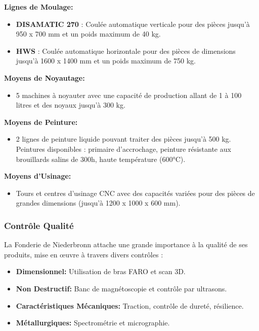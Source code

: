 \documentclass[12pt]{article}
\begin{document}
\textbf{Lignes de Moulage:}
\begin{itemize}
    \item \textbf{DISAMATIC 270} : Coulée automatique verticale pour des pièces jusqu'à 950 x 700 mm et un poids maximum de 40 kg.
    \item \textbf{HWS} : Coulée automatique horizontale pour des pièces de dimensions jusqu'à 1600 x 1400 mm et un poids maximum de 750 kg.
\end{itemize}

\textbf{Moyens de Noyautage:}
\begin{itemize}
    \item 5 machines à noyauter avec une capacité de production allant de 1 à 100 litres et des noyaux jusqu'à 300 kg.
\end{itemize}

\textbf{Moyens de Peinture:}
\begin{itemize}
    \item 2 lignes de peinture liquide pouvant traiter des pièces jusqu'à 500 kg. Peintures disponibles : primaire d'accrochage, peinture résistante aux brouillards salins de 300h, haute température (600°C).
\end{itemize}

\textbf{Moyens d'Usinage:}
\begin{itemize}
    \item Tours et centres d'usinage CNC avec des capacités variées pour des pièces de grandes dimensions (jusqu'à 1200 x 1000 x 600 mm).
\end{itemize}

\subsubsection*{Contrôle Qualité}
La Fonderie de Niederbronn attache une grande importance à la qualité de ses produits, mise en œuvre à travers divers contrôles :
\begin{itemize}
    \item \textbf{Dimensionnel:} Utilisation de bras FARO et scan 3D.
    \item \textbf{Non Destructif:} Banc de magnétoscopie et contrôle par ultrasons.
    \item \textbf{Caractéristiques Mécaniques:} Traction, contrôle de dureté, résilience.
    \item \textbf{Métallurgiques:} Spectrométrie et micrographie.
\end{itemize}
\end{document}
